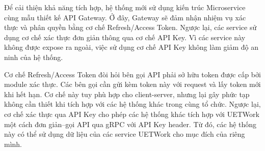 \documentclass[./../main.tex]{subfiles}
\begin{document}
Để cải thiện khả năng tích hợp, hệ thống mới sử dụng kiến trúc Microservice cùng mẫu thiết kế API Gateway. Ở đây, Gateway sẽ đảm nhận nhiệm vụ xác thực và phân quyền bằng cơ chế Refresh/Access Token. Ngược lại, các service sử dụng cơ chế xác thực đơn giản thông qua cơ chế API Key. Vì các service này không được expose ra ngoài, việc sử dụng cơ chế API Key không làm giảm độ an ninh của hệ thống.

Cơ chế Refresh/Access Token đòi hỏi bên gọi API phải sở hữu token được cấp bởi module xác thực. Các bên gọi cần gửi kèm token này với request và lấy token mới khi hết hạn. Cơ chế này tuy phù hợp cho client-server, nhưng lại gây phức tạp không cần thiết khi tích hợp với các hệ thống khác trong cùng tổ chức. Ngược lại, cơ chế xác thực qua API Key cho phép các hệ thống khác tích hợp với UETWork một cách đơn giản--gọi API qua gRPC với API Key header. Từ đó, các hệ thống này có thể sử dụng dữ liệu của các service UETWork cho mục đích của riêng mình.
\end{document}
